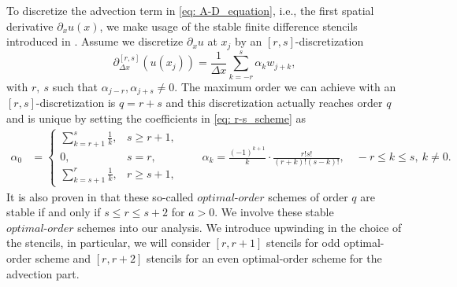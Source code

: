 To discretize the advection term in \eqref{eq: A-D_equation}, i.e., the first spatial derivative $\partial_xu(x)$, we make usage of the stable finite difference stencils introduced in \cite{Iserles1982}. Assume we discretize $\partial_xu$ at $x_j$ by an $[r,s]$-discretization
\begin{equation}\label{eq: r-s_scheme}
\partial^{[r,s]}_{\Delta x}(u(x_j)) = \frac{1}{\Delta x} \sum\limits_{k=-r}^s \alpha_k w_{j+k},
\end{equation}
with $r,\ s$ such that $\alpha_{j-r}, \alpha_{j+s} \neq 0$.
The maximum order we can achieve with an $[r,s]$-discretization is $q=r+s$ and this discretization actually reaches order $q$ and is unique by setting the coefficients in \eqref{eq: r-s_scheme} as
	\begin{align}\label{eq:def_advection_optimal_stencil}
	\alpha_0&=
	\begin{cases}
	\sum\limits_{k=r+1}^s\frac{1}{k}, & s\ge r+1, \\
	0, & s=r, \\
	\sum\limits_{k=s+1}^r\frac{1}{k}, & r\ge s+1, 
	\end{cases} \qquad
	\alpha_k = \frac{(-1)^{k+1}}{k}\cdot \frac{r!s!}{(r+k)!(s-k)!}, \quad -r\le k \le s, \ k\neq0.
	\end{align}
 It is also proven in \cite{Iserles1982} that these so-called $\textit{optimal-order}$ schemes of order $q$ are stable if and only if $s\le r \le s+2$ for $a>0$.
We  involve these stable $\textit{optimal-order}$ schemes into our analysis. 
We introduce upwinding in the choice of the stencils, in particular, we will consider $[r, r +1]$ stencils for odd optimal-order scheme and $[r, r+2]$ stencils for an even optimal-order scheme for the advection part.


